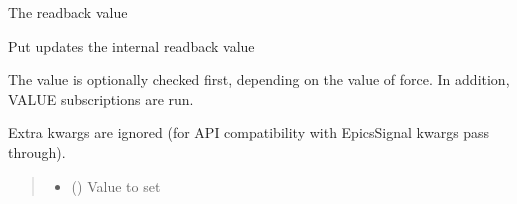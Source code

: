 \documentclass[letterpaper,10pt,english]{sphinxmanual}
\begin{document}
\begin{fulllineitems}
\label{\detokenize{API:raypyng_bluesky.detector.RaypyngTriggerDetector}}
\pysigstartsignatures
{}
\pysigstopsignatures{}

\begin{fulllineitems}
\label{\detokenize{API:raypyng_bluesky.detector.RaypyngTriggerDetector.get}}
\pysigstartsignatures
{}
\pysigstopsignatures
\sphinxAtStartPar
The readback value

\end{fulllineitems}


\begin{fulllineitems}
\label{\detokenize{API:raypyng_bluesky.detector.RaypyngTriggerDetector.put}}
\pysigstartsignatures
{}
\pysigstopsignatures
\sphinxAtStartPar
Put updates the internal readback value

\sphinxAtStartPar
The value is optionally checked first, depending on the value of force.
In addition, VALUE subscriptions are run.

\sphinxAtStartPar
Extra kwargs are ignored (for API compatibility with EpicsSignal kwargs
pass through).
\begin{quote}\begin{description}
\begin{itemize}
\item {} 
\sphinxAtStartPar
{} () \textendash{} Value to set


\end{itemize}
\end{description}
\end{quote}
\end{fulllineitems}
\end{fulllineitems}
\end{document}
